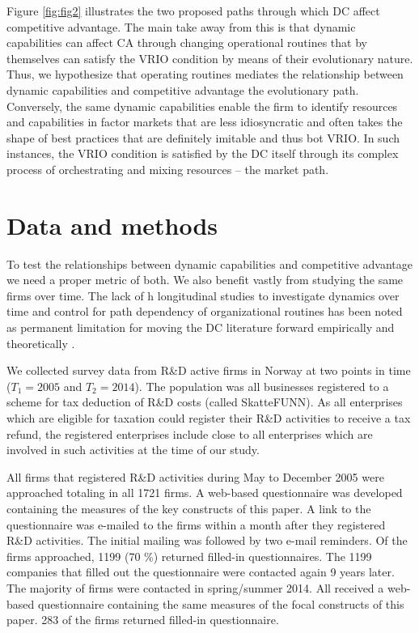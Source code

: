 \documentclass[review,fleqn]{elsarticle}\usepackage[]{graphicx}\usepackage[]{color}
\begin{document}
Figure \ref{fig:fig2} illustrates the two proposed paths through which DC affect
competitive advantage. The main take away from this is that dynamic capabilities can
affect CA through changing operational routines that by themselves can satisfy the VRIO
condition by means of their evolutionary nature. Thus, we hypothesize that operating
routines mediates the relationship between dynamic capabilities and competitive advantage
the evolutionary path. Conversely, the same dynamic capabilities enable the firm to
identify resources and capabilities in factor markets that are less idiosyncratic and
often takes the shape of best practices that are definitely imitable and thus bot VRIO. In
such instances, the VRIO condition is satisfied by the DC itself through its complex
process of orchestrating and mixing resources – the market path.


\section{Data and methods}

To test the relationships between dynamic capabilities and competitive advantage we need a
proper metric of both. We also benefit vastly from studying the same firms over time.  The
lack of h longitudinal studies to investigate dynamics over time and control for path
dependency of organizational routines has been noted as permanent limitation for moving
the DC literature forward empirically and theoretically \cite{Schilke2018}.

We collected survey data from R\&D active firms in Norway at two points in time
($T_1=2005$ and $T_2=2014$). The population was all businesses registered to a scheme for
tax deduction of R\&D costs (called SkatteFUNN). As all enterprises which are eligible for
taxation could register their R\&D activities to receive a tax refund, the registered
enterprises include close to all enterprises which are involved in such activities at the
time of our study.

All firms that registered R\&D activities during May to December 2005 were approached
totaling in all 1721 firms. A web-based questionnaire was developed containing the
measures of the key constructs of this paper. A link to the questionnaire was e-mailed to
the firms within a month after they registered R\&D activities. The initial mailing was
followed by two e-mail reminders. Of the firms approached, 1199 (70 \%) returned filled-in
questionnaires. The 1199 companies that filled out the questionnaire were contacted again
9 years later. The majority of firms were contacted in spring/summer 2014. All received a
web-based questionnaire containing the same measures of the focal constructs of this
paper. 283 of the firms returned filled-in questionnaire.
\end{document}
